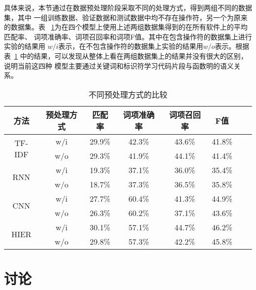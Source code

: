 具体来说，本节通过在数据预处理阶段采取不同的处理方式，得到两组不同的数据集，其中
一组训练数据、验证数据和测试数据中均不存在操作符，另一个为原来的数据集。表
~\ref{operator}为在四个模型上使用上述两组数据集得到的在所有软件上的平均匹配率、
词项准确率、词项召回率和词项F值。其中在包含操作符的数据集上进行实验的结果用
$w/i$表示，在不包含操作符的数据集上实验的结果用$w/o$表示。根据表~\ref{operator}
中的结果，可以发现从整体上看在两组数据集上的结果并没有很大的区别，说明当前这四种
模型主要通过关键词和标识符学习代码片段与函数明的语义关系。

\begin{table}[!t]
\zihaowu
\renewcommand{\arraystretch}{1.4}
\caption{不同预处理方式的比较}
\label{operator}
\centering
\begin{tabular}{cccccccc}
\toprule
 方法 &预处理方式 &匹配率 &词项准确率 &词项召回率 &F值\\ 
\midrule
\multirow{2}{*}{TF-IDF}&w/i&29.9\%&42.3\% &43.6\% &41.8\% \\ 
&w/o&29.3\% &41.9\% &44.1\% &41.4\% \\ 
\multirow{2}{*}{RNN}&w/i&19.3\% &37.1\% &36.0\%  &35.4\% \\ 
&w/o&18.7\% &37.3\% &36.5\% &35.8\% \\
\multirow{2}{*}{CNN}&w/i& 27.7\% &60.4\% &41.3\% &44.9\% \\ 
&w/o&26.3\% &60.2\% &37.1\% &43.6\% \\
\multirow{2}{*}{HIER}&w/i&30.1\% &57.1\% &44.7\% &46.2\% \\
&w/o&29.8\% &57.3\% &42.2\% &45.8\% \\
\bottomrule
\end{tabular}
\end{table}

\section{讨论}




